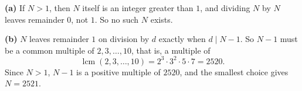 \textbf{(a)} If $N>1$, then $N$ itself is an integer greater than $1$, and dividing $N$ by $N$ leaves remainder $0$, not $1$. So no such $N$ exists.

\textbf{(b)} $N$ leaves remainder $1$ on division by $d$ exactly when $d\mid N-1$. So $N-1$ must be a common multiple of $2,3,\dots,10$, that is, a multiple of
\[\operatorname{lcm}(2,3,\dots,10)=2^3\cdot3^2\cdot5\cdot7=2520 .\]
Since $N>1$, $N-1$ is a positive multiple of $2520$, and the smallest choice gives $N=\boxed{2521}$.
